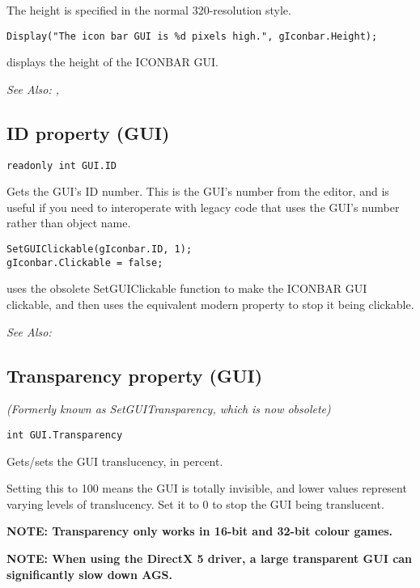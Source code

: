 The height is specified in the normal 320-resolution style.

\begin{verbatim}
Display("The icon bar GUI is %d pixels high.", gIconbar.Height);
\end{verbatim}
displays the height of the ICONBAR GUI.

\it{See Also:} , 


\subsection{ID property (GUI)}\label{GUI.ID}%

\begin{verbatim}
readonly int GUI.ID
\end{verbatim}
Gets the GUI's ID number. This is the GUI's number from the editor, and is useful
if you need to interoperate with legacy code that uses the GUI's number rather than
object name.

\begin{verbatim}
SetGUIClickable(gIconbar.ID, 1);
gIconbar.Clickable = false;
\end{verbatim}
uses the obsolete SetGUIClickable function to make the ICONBAR GUI clickable,
and then uses the equivalent modern property to stop it being clickable.

\it{See Also:} 


\subsection{Transparency property (GUI)}\label{GUI.Transparency}%

\it{(Formerly known as SetGUITransparency, which is now obsolete)}

\begin{verbatim}
int GUI.Transparency
\end{verbatim}
Gets/sets the GUI translucency, in percent.

Setting this to 100 means the GUI is totally invisible, and lower values
represent varying levels of translucency. Set it to 0 to stop the
GUI being translucent.

\bf{NOTE:} Transparency only works in 16-bit and 32-bit colour games.

\bf{NOTE:} When using the DirectX 5 driver, a large transparent GUI can significantly slow
down AGS.

